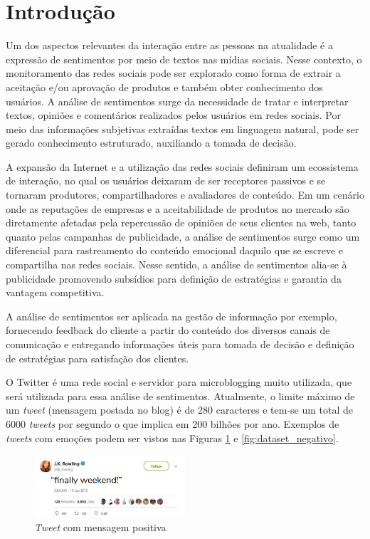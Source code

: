 \documentclass[conference]{IEEEtran}
\begin{document}
\section{Introdução}
Um dos aspectos relevantes da interação entre as pessoas na atualidade é a expressão de sentimentos por meio de textos nas mídias sociais. Nesse contexto, o monitoramento das redes sociais pode ser explorado como forma de extrair a aceitação e/ou aprovação de produtos e também obter conhecimento dos usuários. A análise de sentimentos surge da necessidade de tratar e interpretar textos, opiniões e comentários realizados pelos usuários em redes sociais. Por meio das informações subjetivas extraídas textos em linguagem natural, pode ser gerado conhecimento estruturado, auxiliando a tomada de decisão. 

A expansão da Internet e a utilização das redes sociais definiram um ecossistema de interação, no qual os usuários deixaram de ser receptores passivos e se tornaram produtores, compartilhadores e avaliadores de conteúdo. Em um cenário onde as reputações de empresas e a aceitabilidade de produtos no mercado são diretamente afetadas pela repercussão de opiniões de seus clientes na web, tanto quanto pelas campanhas de publicidade, a análise de sentimentos surge como um diferencial para rastreamento do conteúdo emocional daquilo que se escreve e compartilha nas redes sociais. Nesse sentido, a análise de sentimentos alia-se à publicidade promovendo subsídios para definição de estratégias e garantia da vantagem competitiva.

A análise de sentimentos ser aplicada na gestão de informação por exemplo, fornecendo feedback do cliente a partir do conteúdo dos diversos canais de comunicação e entregando informações úteis para tomada de decisão e definição de estratégias para satisfação dos clientes.

O Twitter\cite{twitter} é uma rede social e servidor para microblogging muito utilizada, que será utilizada para essa análise de sentimentos. Atualmente, o limite máximo de um \textit{tweet} (mensagem postada no blog) é de 280 caracteres e tem-se um total de 6000 \textit{tweets} por segundo o que implica em 200 bilhões por ano. Exemplos de \textit{tweets} com emoções podem ser vistos nas Figuras \ref{fig:dataset_positivo} e \ref{fig:dataset_negativo}.

\begin{figure}[htbp]
	\includegraphics[width=0.5\textwidth,center]{imgs/tweet_positivo.png}
	\caption{\textit{Tweet} com mensagem positiva}
	\label{fig:dataset_positivo}
\end{figure}
\end{document}
